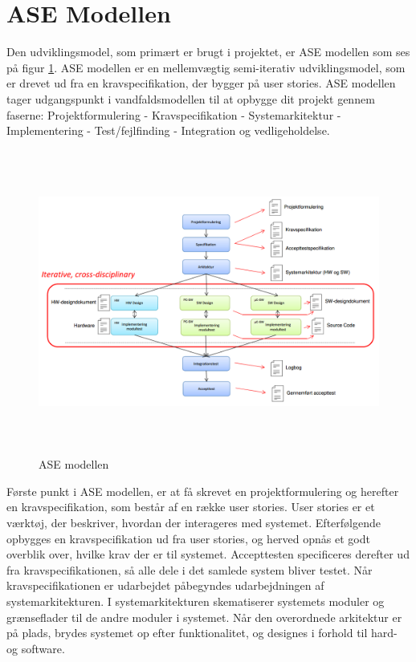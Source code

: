 \section{ASE Modellen} 
\noindent Den udviklingsmodel, som primært er brugt i projektet, er ASE modellen som ses på figur \ref{fig:ASE}. ASE modellen er en mellemvægtig semi-iterativ udviklingsmodel, som er drevet ud fra en kravspecifikation, der bygger på user stories. ASE modellen tager udgangspunkt i vandfaldsmodellen til at opbygge dit projekt gennem faserne: Projektformulering - Kravspecifikation - Systemarkitektur -  Implementering -  Test/fejlfinding -  Integration og vedligeholdelse.

\begin{figure} [!ht]
	\begin{center}
		\includegraphics[height=10cm, width=12cm]{Projektbeskrivelse/subpages/ASEModellen.png}
	\end{center}
	\caption{ASE modellen \cite{ASE}}
	\label{fig:ASE}
\end{figure}

\noindent Første punkt i ASE modellen, er at få skrevet en projektformulering og herefter en kravspecifikation, som består af en række user stories. User stories er et værktøj, der beskriver, hvordan der interageres med systemet. Efterfølgende opbygges en kravspecifikation ud fra user stories, og herved opnås et godt overblik over, hvilke krav der er til systemet. Accepttesten specificeres derefter ud fra kravspecifikationen, så alle dele i det samlede system bliver testet.
Når kravspecifikationen er udarbejdet påbegyndes udarbejdningen af systemarkitekturen. I systemarkitekturen skematiserer systemets moduler og grænseflader til de andre moduler i systemet. Når den overordnede arkitektur er på plads, brydes systemet op efter funktionalitet, og designes i forhold til hard- og software. \\

